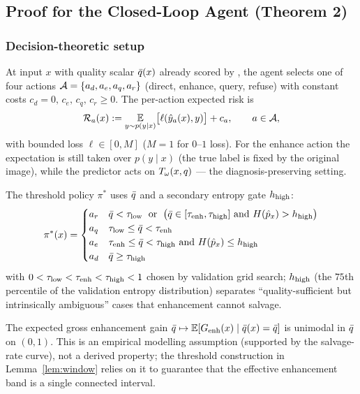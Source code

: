 
\subsection{Proof for the Closed-Loop Agent (Theorem 2)}\label{app:a2-thm2}

\subsubsection{Decision-theoretic setup}\label{app:a2-thm2-setup}
At input $x$ with quality scalar $\bar{q}(x)$ already scored by \visiscore, the agent
selects one of four actions $\mathcal{A}=\{a_d,a_e,a_q,a_r\}$ (direct, enhance, query,
refuse) with constant costs $c_d=0,\,c_e,\,c_q,\,c_r\geq 0$. The per-action expected risk is
\begin{equation}
\mathcal{R}_a(x) := \operatorname*{\mathbb{E}}_{y\sim p(y\mid x)}\!\big[\ell(\hat{y}_a(x), y)\big] + c_a,
\qquad a\in\mathcal{A},
\label{eq:per-action}
\end{equation}
with bounded loss $\ell\in[0,M]$ ($M=1$ for $0$--$1$ loss). For the enhance action the
expectation is still taken over $p(y\mid x)$ (the true label is fixed by the original image),
while the predictor acts on $T_\omega(x,q)$ --- the diagnosis-preserving setting.

The threshold policy $\pi^{*}$ uses $\bar{q}$ and a secondary entropy gate $h_{\mathrm{high}}$:
\begin{equation}
\pi^{*}(x) =
\begin{cases}
a_r & \bar{q} < \tau_{\mathrm{low}} \;\text{ or }\; \big(\bar{q}\in[\tau_{\mathrm{enh}},\tau_{\mathrm{high}}]\text{ and }H(\hat{p}_x)>h_{\mathrm{high}}\big)\\
a_q & \tau_{\mathrm{low}} \leq \bar{q} < \tau_{\mathrm{enh}} \\
a_e & \tau_{\mathrm{enh}} \leq \bar{q} < \tau_{\mathrm{high}} \text{ and } H(\hat{p}_x)\leq h_{\mathrm{high}} \\
a_d & \bar{q} \geq \tau_{\mathrm{high}}
\end{cases}
\label{eq:agent-policy}
\end{equation}
with $0<\tau_{\mathrm{low}}<\tau_{\mathrm{enh}}<\tau_{\mathrm{high}}<1$ chosen by validation grid search; $h_{\mathrm{high}}$ (the $75$th
percentile of the validation entropy distribution) separates ``quality-sufficient but
intrinsically ambiguous'' cases that enhancement cannot salvage.

\begin{assumption}\label{as:unimodal}
The expected gross enhancement gain $\bar{q}\mapsto\operatorname*{\mathbb{E}}[G_{\mathrm{enh}}(x)\mid\bar{q}(x)=\bar{q}]$ is unimodal in
$\bar{q}$ on $(0,1)$. This is an empirical modelling assumption (supported by the salvage-rate
curve), not a derived property; the threshold construction in Lemma~\ref{lem:window} relies on
it to guarantee that the effective enhancement band is a single connected interval.
\end{assumption}

